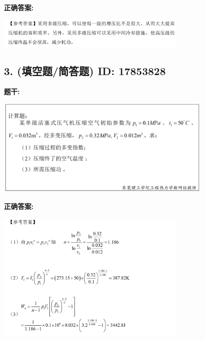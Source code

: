 \documentclass[12pt]{article}
\begin{document}
\textbf{正确答案:}

\begin{center}\includegraphics[width=0.7\textwidth, height=0.2\textheight, keepaspectratio]{question_2_17853825/correct_answer_1_img_1.png}\end{center}

\vspace{0.5em}\hrulefill\vspace{1em}

\subsection*{3. (填空题/简答题) \small ID: 17853828}

\textbf{题干:}


\begin{center}\includegraphics[width=0.8\textwidth, height=0.25\textheight, keepaspectratio]{question_3_17853828/title_img_1.png}\end{center}

\textbf{正确答案:}

\begin{center}\includegraphics[width=0.7\textwidth, height=0.2\textheight, keepaspectratio]{question_3_17853828/correct_answer_1_img_1.png}\end{center}
\end{document}
